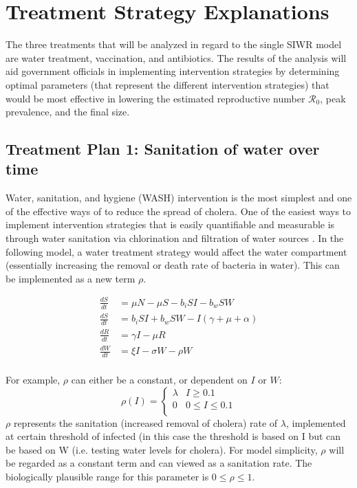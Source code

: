 \documentclass[12pt]{article}\usepackage[]{graphicx}\usepackage[]{color}
\begin{document}
\section{Treatment Strategy Explanations}

The three treatments that will be analyzed in regard to the single SIWR model are water treatment, vaccination, and antibiotics.
The results of the analysis will aid government officials in implementing intervention strategies by determining optimal  parameters (that represent the different intervention strategies) that would be most effective in lowering the estimated reproductive number $\mathcal R_0$, peak prevalence, and the final size.
\subsection{Treatment Plan 1: Sanitation of water over time}
Water, sanitation, and hygiene (WASH) intervention is the most simplest and one of the effective ways of to reduce the spread of cholera.
One of the easiest ways to implement intervention strategies that is easily quantifiable and measurable is through water sanitation via chlorination and filtration of water sources \citep{link26}.
In the following model, a water treatment strategy would affect the water compartment (essentially increasing the removal or death rate of bacteria in water).
This can be implemented as a new term $\rho$. \par

\begin{align*}
	\frac{dS}{dt}&= \mu N - \mu S - b_i SI - b_w S W  \\
	\frac{dS}{dt}&= b_i S I + b_w S W - I (\gamma + \mu + \alpha) \\
	\frac{dR}{dt}&= \gamma I - \mu R \\
	\frac{dW}{dt}&= \xi I  - \sigma W - \rho W\\
\end{align*}

For example, $\rho$ can either be a constant, or dependent on $I$ or $W$:\\
$$\rho (I)= \begin{cases}
			 			\lambda & I \geq 0.1 \\
			 			0 & 0 \leq I \leq 0.1 \\
			 			\end{cases}$$
$\rho$ represents the sanitation (increased removal of cholera) rate of $\lambda$, implemented at certain threshold of infected (in this case the threshold is based on I but can be based on W (i.e. testing water levels for cholera).
For model simplicity, $\rho$ will be regarded as a constant term and can viewed as a sanitation rate. The biologically plausible range for this parameter is $0 \leq \rho \leq 1$.\\
\end{document}
